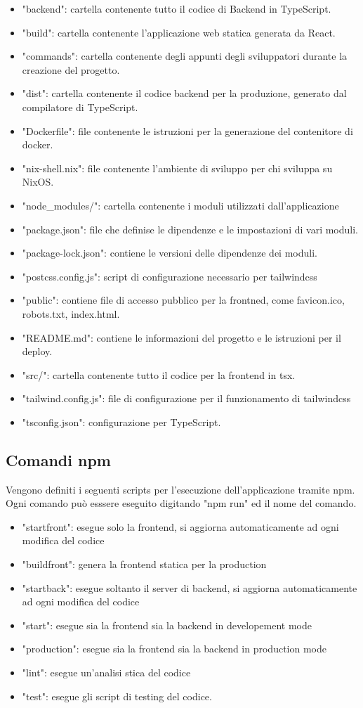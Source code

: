 \documentclass{report}
\begin{document}
\begin{itemize}
	\item "backend": cartella contenente tutto il codice di Backend in TypeScript.
	\item "build": cartella contenente l'applicazione web statica generata da React.
	\item "commands": cartella contenente degli appunti degli sviluppatori durante la creazione del progetto.
	\item "dist": cartella contenente il codice backend per la produzione, generato dal compilatore di TypeScript.
	\item "Dockerfile": file contenente le istruzioni per la generazione del contenitore di docker.
	\item "nix-shell.nix": file contenente l'ambiente di sviluppo per chi sviluppa su NixOS.
	\item "node\_modules/": cartella contenente i moduli utilizzati dall'applicazione
	\item "package.json": file che definise le dipendenze e le impostazioni di vari moduli.
	\item "package-lock.json": contiene le versioni delle dipendenze dei moduli.
	\item "postcss.config.js": script di configurazione necessario per tailwindcss
	\item "public": contiene file di accesso pubblico per la frontned, come favicon.ico, robots.txt, index.html.
	\item "README.md": contiene le informazioni del progetto e le istruzioni per il deploy.
	\item "src/": cartella contenente tutto il codice per la frontend in tsx.
	\item "tailwind.config.js": file di configurazione per il funzionamento di tailwindcss
	\item "tsconfig.json": configurazione per TypeScript.
\end{itemize}

\subsection{Comandi npm}
Vengono definiti i seguenti scripts per l'esecuzione dell'applicazione tramite npm. Ogni comando può esssere eseguito digitando "npm run" ed il nome del comando.
\begin{itemize}
	\item "startfront": esegue solo la frontend, si aggiorna automaticamente ad ogni modifica del codice
	\item "buildfront": genera la frontend statica per la production
	\item "startback": esegue soltanto il server di backend, si aggiorna automaticamente ad ogni modifica del codice
	\item "start": esegue sia la frontend sia la backend in developement mode
	\item "production": esegue sia la frontend sia la backend in production mode
	\item "lint": esegue un'analisi stica del codice
	\item "test": esegue gli script di testing del codice.
\end{itemize}
	
\end{document}
